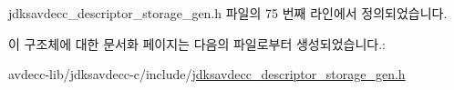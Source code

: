 jdksavdecc\+\_\+descriptor\+\_\+storage\+\_\+gen.\+h 파일의 75 번째 라인에서 정의되었습니다.



이 구조체에 대한 문서화 페이지는 다음의 파일로부터 생성되었습니다.\+:\begin{DoxyCompactItemize}
\item 
avdecc-\/lib/jdksavdecc-\/c/include/\hyperlink{jdksavdecc__descriptor__storage__gen_8h}{jdksavdecc\+\_\+descriptor\+\_\+storage\+\_\+gen.\+h}\end{DoxyCompactItemize}
